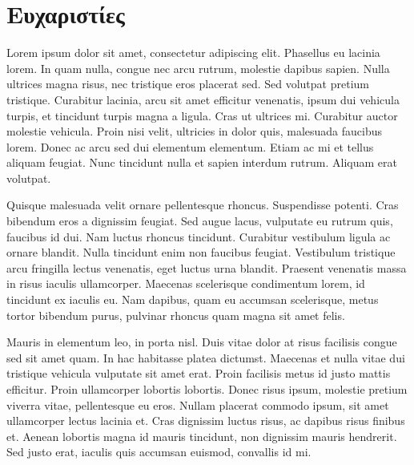 \section*{Ευχαριστίες}
{}


Lorem ipsum dolor sit amet, consectetur adipiscing elit. Phasellus eu lacinia lorem. In quam nulla, congue nec arcu rutrum, molestie dapibus sapien. Nulla ultrices magna risus, nec tristique eros placerat sed. Sed volutpat pretium tristique. Curabitur lacinia, arcu sit amet efficitur venenatis, ipsum dui vehicula turpis, et tincidunt turpis magna a ligula. Cras ut ultrices mi. Curabitur auctor molestie vehicula. Proin nisi velit, ultricies in dolor quis, malesuada faucibus lorem. Donec ac arcu sed dui elementum elementum. Etiam ac mi et tellus aliquam feugiat. Nunc tincidunt nulla et sapien interdum rutrum. Aliquam erat volutpat.

Quisque malesuada velit ornare pellentesque rhoncus. Suspendisse potenti. Cras bibendum eros a dignissim feugiat. Sed augue lacus, vulputate eu rutrum quis, faucibus id dui. Nam luctus rhoncus tincidunt. Curabitur vestibulum ligula ac ornare blandit. Nulla tincidunt enim non faucibus feugiat. Vestibulum tristique arcu fringilla lectus venenatis, eget luctus urna blandit. Praesent venenatis massa in risus iaculis ullamcorper. Maecenas scelerisque condimentum lorem, id tincidunt ex iaculis eu. Nam dapibus, quam eu accumsan scelerisque, metus tortor bibendum purus, pulvinar rhoncus quam magna sit amet felis.

Mauris in elementum leo, in porta nisl. Duis vitae dolor at risus facilisis congue sed sit amet quam. In hac habitasse platea dictumst. Maecenas et nulla vitae dui tristique vehicula vulputate sit amet erat. Proin facilisis metus id justo mattis efficitur. Proin ullamcorper lobortis lobortis. Donec risus ipsum, molestie pretium viverra vitae, pellentesque eu eros. Nullam placerat commodo ipsum, sit amet ullamcorper lectus lacinia et. Cras dignissim luctus risus, ac dapibus risus finibus et. Aenean lobortis magna id mauris tincidunt, non dignissim mauris hendrerit. Sed justo erat, iaculis quis accumsan euismod, convallis id mi.
